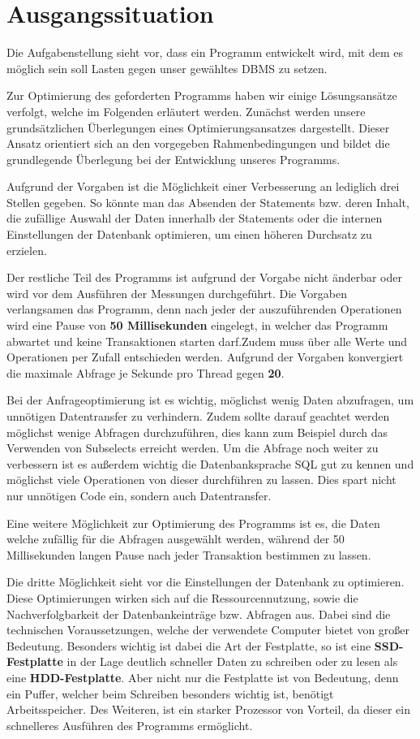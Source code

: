 \section{Ausgangssituation}
Die Aufgabenstellung sieht vor, dass ein Programm entwickelt wird, mit dem es
möglich sein soll Lasten gegen unser gewähltes DBMS zu setzen. 

Zur Optimierung des geforderten Programms haben wir einige Lösungsansätze
verfolgt, welche im Folgenden erläutert werden. Zunächst werden unsere
grundsätzlichen Überlegungen eines Optimierungsansatzes dargestellt. Dieser
Ansatz orientiert sich an den vorgegeben Rahmenbedingungen und bildet die
grundlegende Überlegung bei der Entwicklung unseres Programms.

Aufgrund der Vorgaben ist die Möglichkeit einer Verbesserung an lediglich drei
Stellen gegeben. So könnte man das Absenden der Statements bzw. deren Inhalt,
die zufällige Auswahl der Daten innerhalb der Statements oder die internen
Einstellungen der Datenbank optimieren, um einen höheren Durchsatz zu erzielen.

Der restliche Teil des Programms ist aufgrund der Vorgabe nicht änderbar oder
wird vor dem Ausführen der Messungen durchgeführt. Die Vorgaben verlangsamen
das Programm, denn nach jeder der auszuführenden Operationen wird eine Pause
von \textbf{50 Millisekunden} eingelegt, in welcher das Programm abwartet und
keine Transaktionen starten darf.Zudem muss über alle Werte und Operationen per
Zufall entschieden werden. Aufgrund der Vorgaben konvergiert die maximale
Abfrage je Sekunde pro Thread gegen \textbf{20}.

Bei der Anfrageoptimierung ist es wichtig, möglichst wenig Daten abzufragen, um
unnötigen Datentransfer zu verhindern. Zudem sollte darauf geachtet werden
möglichst wenige Abfragen durchzuführen, dies kann zum Beispiel durch das
Verwenden von Subselects erreicht werden. Um die Abfrage noch weiter zu
verbessern ist es außerdem wichtig die Datenbanksprache SQL gut zu kennen und
möglichst viele Operationen von dieser durchführen zu lassen. Dies spart nicht
nur unnötigen Code ein, sondern auch Datentransfer.

Eine weitere Möglichkeit zur Optimierung des Programms ist es, die Daten welche
zufällig für die Abfragen ausgewählt werden, während der 50 Millisekunden
langen Pause nach jeder Transaktion bestimmen zu lassen. 

Die dritte Möglichkeit sieht vor die Einstellungen der Datenbank zu optimieren.
Diese Optimierungen wirken sich auf die Ressourcennutzung, sowie die
Nachverfolgbarkeit der Datenbankeinträge bzw. Abfragen aus. Dabei sind die
technischen Voraussetzungen, welche der verwendete Computer bietet von großer
Bedeutung. Besonders wichtig ist dabei die Art der Festplatte, so ist eine
\textbf{SSD-Festplatte} in der Lage deutlich schneller Daten zu schreiben oder
zu lesen als eine \textbf {HDD-Festplatte}. Aber nicht nur die Festplatte ist von
Bedeutung, denn ein Puffer, welcher beim Schreiben besonders wichtig ist, benötigt
Arbeitsspeicher. Des Weiteren, ist ein starker Prozessor von Vorteil, da dieser
ein schnelleres Ausführen des Programms ermöglicht.

\clearpage